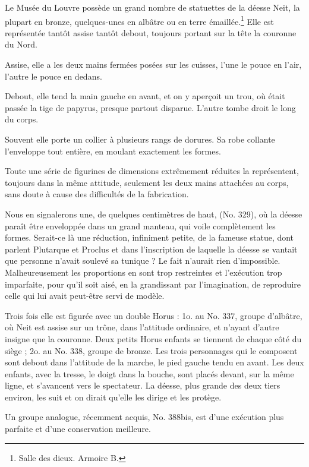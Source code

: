 \documentclass[a4paper, 11pt, oneside]{article}
\begin{document}
Le Musée du Louvre possède un grand nombre de statuettes de la déesse Neit, la plupart en bronze, quelques-unes en albâtre ou en terre émaillée.\footnote{Salle des dieux. Armoire B.} Elle est représentée tantôt assise tantôt debout, toujours portant sur la tête la couronne du Nord.

Assise, elle a les deux mains fermées posées sur les cuisses, l'une le pouce en l'air, l'autre le pouce en dedans.

Debout, elle tend la main gauche en avant, et on y aperçoit un trou, où était passée la tige de papyrus, presque partout disparue. L'autre tombe droit le long du corps.

Souvent elle porte un collier à plusieurs rangs de dorures. Sa robe collante l'enveloppe tout entière, en moulant exactement les formes.

Toute une série de figurines de dimensions extrêmement réduites la représentent, toujours dans la même attitude, seulement les deux mains attachées au corps, sans doute à cause des difficultés de la fabrication.

Nous en signalerons une, de quelques centimètres de haut, (No. 329), où la déesse paraît être enveloppée dans un grand manteau, qui voile complètement les formes. Serait-ce là une réduction, infiniment petite, de la fameuse statue, dont parlent Plutarque et Proclus et dans l'inscription de laquelle la déesse se vantait que personne n'avait soulevé sa tunique ? Le fait n'aurait rien d'impossible. Malheureusement les proportions en sont trop restreintes et l'exécution trop imparfaite, pour qu'il soit aisé, en la grandissant par l'imagination, de reproduire celle qui lui avait peut-être servi de modèle.

Trois fois elle est figurée avec un double Horus : 1o. au No. 337, groupe d'albâtre, où Neit est assise sur un trône, dans l'attitude ordinaire, et n'ayant d'autre insigne que la couronne. Deux petits Horus enfants se tiennent de chaque côté du siège ; 2o. au No. 338, groupe de bronze. Les trois personnages qui le composent sont debout dans l'attitude de la marche, le pied gauche tendu en avant. Les deux enfants, avec la tresse, le doigt dans la bouche, sont placés devant, sur la même ligne, et s'avancent vers le spectateur. La déesse, plus grande des deux tiers environ, les suit et on dirait qu'elle les dirige et les protège.

Un groupe analogue, récemment acquis, No. 388bis, est d'une exécution plus parfaite et d'une conservation meilleure.
\end{document}
